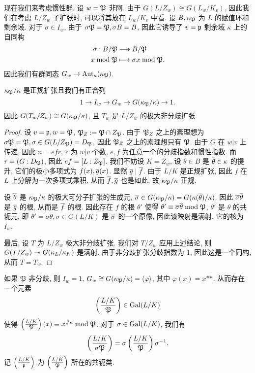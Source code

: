 现在我们来考虑惯性群. 设 $w={\mathfrak{P}}$ 非阿. 由于 $G(L/Z_w)\cong G(L_w/K_v)$, 因此我们在考虑 $L/Z_w$ 子扩张时, 可以将其放在 $L_w/K_v$ 中看.
设 $B,\kappa_{\mathfrak{P}}$ 为 $L$ 的赋值环和剩余域. 对于 $\sigma\in I_w$, 由于 $\sigma {\mathfrak{P}}={\mathfrak{P}},\sigma B=B$, 因此它诱导了 $v={\mathfrak{p}}$ 剩余域 $\kappa$ 上的自同构
  \[\begin{split}
\bar \sigma:B/{\mathfrak{P}}&\longrightarrow B/{\mathfrak{P}}\\
x\bmod{\mathfrak{P}}&\longmapsto \sigma x\bmod{\mathfrak{P}}.
\end{split}\]
因此我们有群同态 $G_w\to {\mathrm{Aut}}_{\kappa}(\kappa_{\mathfrak{P}})$.

\begin{proposition}{}{}
$\kappa_{\mathfrak{P}}/\kappa$ 是正规扩张且我们有正合列
  \[1\rightarrow I_w\rightarrow G_w\rightarrow G(\kappa_{\mathfrak{P}}/\kappa)\rightarrow 1.\]
因此 $G(T_w/Z_w)\cong G(\kappa_{\mathfrak{P}}/\kappa)$, 且 $T_w$ 是 $L/Z_w$ 的极大非分歧扩张.
\end{proposition}
\begin{proof}
设 $v={\mathfrak{p}},w={\mathfrak{P}}$, ${\mathfrak{P}}_Z:={\mathfrak{P}}\cap Z_{\mathfrak{P}}$. 由于 ${\mathfrak{P}}_Z$ 之上的素理想为 $\sigma{\mathfrak{P}}={\mathfrak{P}},\sigma\in G(L/Z_{\mathfrak{P}})=D_{\mathfrak{P}}$, 因此 ${\mathfrak{P}}_Z$ 之上的素理想只有 ${\mathfrak{P}}$. 由于 $G$ 在 $w|v$ 上传递, 因此 $n=efr$, $r$ 为 $w|v$ 个数, $e,f$ 为任意一个的分歧指数和惯性指数. 而 $r=(G:D_{\mathfrak{P}})$, 因此 $ef=[L:Z_{\mathfrak{P}}]$. 我们不妨设 $K=Z_w$, 设 $\theta\in B$ 是 $\overline\theta\in\kappa$ 的提升, 它们的极小多项式为 $f(x),\overline g(x)$. 显然 $\overline g\mid \overline f$. 由于 $L/K$ 是正规扩张, 因此 $f$ 在 $L$ 上分解为一次多项式乘积, 从而 $\overline f,\overline g$ 也是如此, 故 $\kappa_{\mathfrak{P}}/\kappa$ 正规.

设 $\overline\theta$ 是 $\kappa_{\mathfrak{P}}/\kappa$ 的极大可分子扩张的生成元, $\overline\sigma\in G(\kappa_{\mathfrak{P}}/\kappa)=G(\kappa(\overline\theta)/\kappa)$. 因此 $\overline\sigma\overline\theta$ 是 $\overline g$ 的根, 从而是 $\overline f$ 的根. 因此存在 $f$ 的根 $\theta'$ 使得 $\theta'\equiv \overline \sigma\overline\theta\bmod{\mathfrak{P}}$, $\theta'$ 是 $\theta$ 的共轭元, 即 $\theta'=\sigma\theta,\sigma\in G(L/K)$ 是 $\overline \sigma$ 的一个原像, 因此该映射是满射. 它的核为 $I_w$.

最后, 设 $T$ 为 $L/Z_w$ 极大非分歧扩张. 我们对 $T/Z_w$ 应用上述结论, 则 $G(T/Z_w)\twoheadrightarrow G(\kappa_L/\kappa_K)$ 是满射. 由于非分歧扩张分歧指数为 $1$, 因此这是一个同构, 从而 $T=T_w$.
\end{proof}

如果 ${\mathfrak{P}}$ 非分歧, 则 $I_w=1$, $G_w\cong G(\kappa_{\mathfrak{P}}/\kappa)=\langle{\varphi}\rangle$, 其中 $\varphi(x)=x^{\#\kappa}$. 从而存在一个元素
	\[\left(\frac{{L/K}}{{\mathfrak{P}}}\right)\in {\mathrm{Gal}}(L/K)\]
使得 $\left(\frac{{L/K}}{{\mathfrak{P}}}\right)(x)\equiv x^{\#\kappa}\bmod{\mathfrak{P}}$.
对于 $\sigma\in{\mathrm{Gal}}(L/K)$, 我们有
	\[\left(\frac{{L/K}}{\sigma{\mathfrak{P}}}\right)=\sigma\left(\frac{{L/K}}{{\mathfrak{P}}}\right)\sigma^{-1}.\]
记 $\left(\frac{{L/K}}{{\mathfrak{p}}}\right)$ 为 $\left(\frac{{L/K}}{{\mathfrak{P}}}\right)$ 所在的共轭类.

